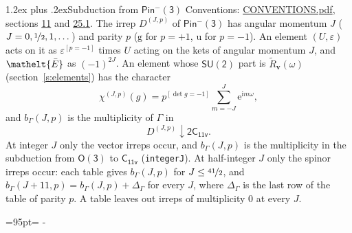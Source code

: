 \documentclass[10pt,a4paper]{article}
\makeatletter
\renewcommand\section{\@startsection{section}{1}{\z@}{-3ex plus -1ex minus -.2ex}%
  {1.2ex plus .2ex}{\normalfont\large\sffamily\bfseries\color{parttitle}}}
\newcommand{\needspace}[1]{\par\penalty-100\begingroup\dimen0=#1\relax\dimen2=\pagegoal
  \advance\dimen2-\pagetotal\ifdim\dimen0>\dimen2\relax\ifdim\dimen2>0pt\vfil\break\fi\fi
  \endgroup}
\numberwithin{equation}{section}
\newcommand{\eltfont}[1]{{\let\sigma\eltsigma\mathelt{#1}}}
\newcommand{\grp}[1]{\mathsf{#1}}
\newcommand{\elt}[1]{\eltfont{#1}}
\newcommand{\ptag}[1]{\mathrm{#1}}
\newcommand{\iverson}[1]{[#1]}
\newcommand{\restr}[2]{#1\!\downarrow#2}
\newcommand{\vv}{\mathbf{v}}
\newcommand{\iunit}{\mathrm{i}}
\newcommand{\expe}{\mathrm{e}}
\newcommand{\irrJp}[2]{D^{(#1,#2)}}
\newcommand{\barred}[1]{\bar{#1}}
\newcommand{\lift}[1]{\tilde{#1}}
\makeatother
\begin{document}
\section{Subduction from \texorpdfstring{$\grp{Pin^{-}(3)}$}{Pin(3)}}\label{s:subduction_parent}
Conventions: \href{../../CONVENTIONS.pdf}{CONVENTIONS.pdf}, sections \href{../../../rotation/CONVENTIONS.pdf\#conv.11}{11} and \href{../../CONVENTIONS.pdf\#conv.25.1}{25.1}.
\leavevmode\label{n:index.J}\label{n:index.parity}\label{n:irrep.o3}The irrep $\irrJp{J}{p}$ of \href{Pinminus3.pdf}{$\grp{Pin^{-}(3)}$} has angular momentum $J$ ($J = 0, \nicefrac{1}{2}, 1, \dots$) and parity $p$ ($\ptag{g}$ for $p = +1$, $\ptag{u}$ for $p = -1$). An element $(U, \varepsilon)$ acts on it as $\varepsilon^{[p = -1]}$ times $U$ acting on the kets of angular momentum $J$, and $\elt{\barred{E}}$ as $(-1)^{2J}$. \label{n:function.character.parent}\label{n:function.multiplicity}An element whose $\grp{SU(2)}$ part is $\lift{R}_{\vv}(\omega)$ (section~\ref{s:elements}) has the character
\begin{equation}\label{e:chi}\chi^{(J,p)}(g) = p^{\iverson{\det g = -1}}\sum_{m=-J}^{J} \expe^{\iunit m\omega},\end{equation}
and $b_\Gamma(J, p)$ is the multiplicity of $\Gamma$ in
\begin{equation}\label{e:parent}\restr{\irrJp{J}{p}}{\grp{2C_{11v}}}.\end{equation}
At integer $J$ only the vector irreps occur, and $b_\Gamma(J, p)$ is the multiplicity in the subduction from $\grp{O(3)}$ to \href{../../../rotation/data/pdf/C11v.pdf}{$\grp{C_{11v}}$} (\texttt{integerJ}). \label{n:index.increment}At half-integer $J$ only the spinor irreps occur: each table gives $b_\Gamma(J, p)$ for $J \le \nicefrac{41}{2}$, and $b_\Gamma(J + 11, p) = b_\Gamma(J, p) + \Delta_\Gamma$ for every $J$, where $\Delta_\Gamma$ is the last row of the table of parity $p$. A table leaves out irreps of multiplicity 0 at every $J$.
\needspace{95pt}
\end{document}
